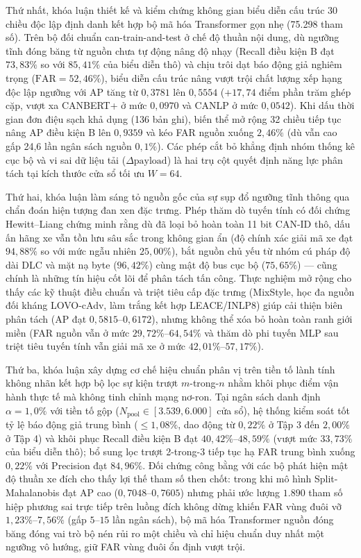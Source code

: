 \documentclass[12pt, a4paper, reqno, oneside]{book}
\begin{document}
Thứ nhất, khóa luận thiết kế và kiểm chứng không gian biểu diễn cấu trúc 30 chiều độc lập định danh kết hợp bộ mã hóa Transformer gọn nhẹ (75.298 tham số). Trên bộ đối chuẩn can-train-and-test ở chế độ thuần nội dung, dù ngưỡng tĩnh đóng băng từ nguồn chưa tự động nâng độ nhạy (Recall điều kiện B đạt $73{,}83\%$ so với $85{,}41\%$ của biểu diễn thô) và chịu trôi dạt báo động giả nghiêm trọng ($\text{FAR} = 52{,}46\%$), biểu diễn cấu trúc nâng vượt trội chất lượng xếp hạng độc lập ngưỡng với AP tăng từ $0{,}3781$ lên $0{,}5554$ ($+17{,}74$ điểm phần trăm ghép cặp, vượt xa CANBERT+ ở mức $0{,}0970$ và CANLP ở mức $0{,}0542$). Khi dấu thời gian đơn điệu sạch khả dụng (136 bản ghi), biến thể mở rộng 32 chiều tiếp tục nâng AP điều kiện B lên $0{,}9359$ và kéo FAR nguồn xuống $2{,}46\%$ (dù vẫn cao gấp 24,6 lần ngân sách nguồn $0{,}1\%$). Các phép cắt bỏ khẳng định nhóm thống kê cục bộ và vi sai dữ liệu tải ($\Delta\text{payload}$) là hai trụ cột quyết định năng lực phân tách tại kích thước cửa sổ tối ưu $W = 64$.

Thứ hai, khóa luận làm sáng tỏ nguồn gốc của sự sụp đổ ngưỡng tĩnh thông qua chẩn đoán hiện tượng đan xen đặc trưng. Phép thăm dò tuyến tính có đối chứng Hewitt--Liang chứng minh rằng dù đã loại bỏ hoàn toàn 11 bit CAN-ID thô, dấu ấn hãng xe vẫn tồn lưu sâu sắc trong không gian ẩn (độ chính xác giải mã xe đạt $94{,}88\%$ so với mức ngẫu nhiên $25{,}00\%$), bắt nguồn chủ yếu từ nhóm cú pháp độ dài DLC và mặt nạ byte ($96{,}42\%$) cùng mật độ bus cục bộ ($75{,}65\%$) --- cũng chính là những tín hiệu cốt lõi để phân tách tấn công. Thực nghiệm mở rộng cho thấy các kỹ thuật điều chuẩn và triệt tiêu cấp đặc trưng (MixStyle, học đa nguồn đối kháng LOVO-cAdv, làm trắng kết hợp LEACE/INLP8) giúp cải thiện biên phân tách (AP đạt $0{,}5815\text{--}0{,}6172$), nhưng không thể xóa bỏ hoàn toàn ranh giới miền (FAR nguồn vẫn ở mức $29{,}72\%\text{--}64{,}54\%$ và thăm dò phi tuyến MLP sau triệt tiêu tuyến tính vẫn giải mã xe ở mức $42{,}01\%\text{--}57{,}17\%$).

Thứ ba, khóa luận xây dựng cơ chế hiệu chuẩn phân vị trên tiền tố lành tính không nhãn kết hợp bộ lọc sự kiện trượt $m$-trong-$n$ nhằm khôi phục điểm vận hành thực tế mà không tinh chỉnh mạng nơ-ron. Tại ngân sách danh định $\alpha = 1{,}0\%$ với tiền tố gộp ($N_{\text{pool}} \in [3.539, 6.000]$ cửa sổ), hệ thống kiểm soát tốt tỷ lệ báo động giả trung bình ($\le 1{,}08\%$, dao động từ $0{,}22\%$ ở Tập 3 đến $2{,}00\%$ ở Tập 4) và khôi phục Recall điều kiện B đạt $40{,}42\%\text{--}48{,}59\%$ (vượt mức $33{,}73\%$ của biểu diễn thô); bổ sung lọc trượt 2-trong-3 tiếp tục hạ FAR trung bình xuống $0{,}22\%$ với Precision đạt $84{,}96\%$. Đối chứng công bằng với các bộ phát hiện mật độ thuần xe đích cho thấy lợi thế tham số then chốt: trong khi mô hình Split-Mahalanobis đạt AP cao ($0{,}7048\text{--}0{,}7605$) nhưng phải ước lượng $1.890$ tham số hiệp phương sai trực tiếp trên luồng đích không dừng khiến FAR vùng đuôi vỡ $1{,}23\%\text{--}7{,}56\%$ (gấp $5\text{--}15$ lần ngân sách), bộ mã hóa Transformer nguồn đóng băng đóng vai trò bộ nén rủi ro một chiều và chỉ hiệu chuẩn duy nhất một ngưỡng vô hướng, giữ FAR vùng đuôi ổn định vượt trội.
\end{document}
